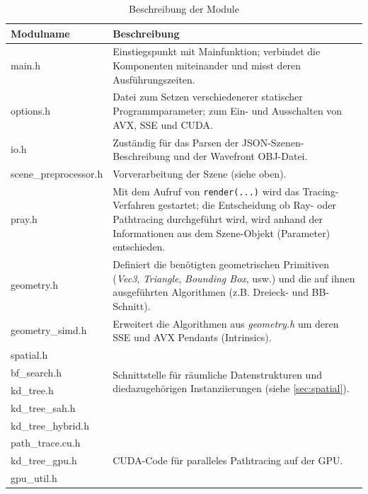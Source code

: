 \begin {table}[htbp]
	\begin{center}
    \begin{tabular}{ | l | p{10cm} |}
    \hline
    \textbf{Modulname} & \textbf{Beschreibung} \\ \hline
    main.h & Einstiegspunkt mit Mainfunktion; verbindet die Komponenten miteinander und misst deren Ausführungszeiten. \\ \hline
    options.h & Datei zum Setzen verschiedenerer statischer Programmparameter; zum Ein- und Ausschalten von AVX, SSE und CUDA. \\ \hline
    io.h & Zuständig für das Parsen der JSON-Szenen-Beschreibung und der Wavefront OBJ-Datei.\\ \hline
    scene\_preprocessor.h & Vorverarbeitung der Szene (siehe oben). \\ \hline
    pray.h & Mit dem Aufruf von \texttt{render(...)} wird das Tracing-Verfahren gestartet; die Entscheidung ob Ray- oder Pathtracing durchgeführt wird, wird anhand der Informationen aus dem Szene-Objekt (Parameter) entschieden. \\ \hline
    geometry.h & Definiert die benötigten geometrischen Primitiven (\textit{Vec3}, \textit{Triangle}, \textit{Bounding Box}, usw.) und die auf ihnen ausgeführten Algorithmen (z.B. Dreieck- und BB-Schnitt). \\ \hline
    geometry\_simd.h & Erweitert die Algorithmen aus \textit{geometry.h} um deren SSE und AVX Pendants (Intrinsics). \\ \hline
    spatial.h  & \multirow{4}{*}{\parbox{10cm}{Schnittstelle für räumliche Datenstrukturen und die\newline dazugehörigen Instanziierungen (siehe \autoref{sec:spatial}).}} \\ 
    bf\_search.h & \\
    kd\_tree.h & \\ 
    kd\_tree\_sah.h & \\ 
    kd\_tree\_hybrid.h & \\ \hline
	path\_trace.cu.h & \multirow{4}{*}{\parbox{10cm}{CUDA-Code für paralleles Pathtracing auf der GPU.}} \\
    kd\_tree\_gpu.h & \\
    gpu\_util.h & \\ \hline
    \end{tabular}
    \caption {Beschreibung der Module}
    \label{tbl:moduls}
	\end{center}
\end {table}

